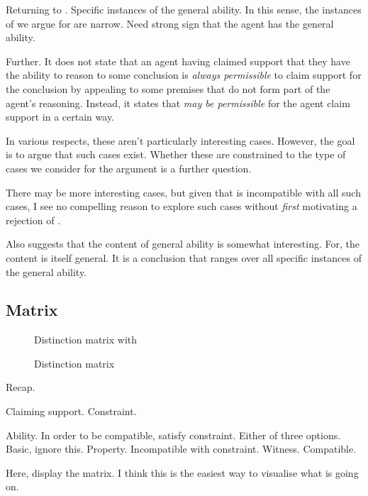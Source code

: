 \begin{note}
  Returning to \EAS{}.
  Specific instances of the general ability.
  In this sense, the instances of \EAS{} we argue for are narrow.
  Need strong sign that the agent has the general ability.

  Further.
  It does not state that an agent having claimed support that they have the ability to reason to some conclusion is \emph{always permissible} to claim support for the conclusion by appealing to some premises that do not form part of the agent's reasoning.
  Instead, it states that \emph{may be permissible} for the agent claim support in a certain way.

  In various respects, these aren't particularly interesting cases.
  However, the goal is to argue that such cases exist.
  Whether these are constrained to the type of cases we consider for the argument is a further question.

  There may be more interesting cases, but given that \ESU{} is incompatible with all such cases, I see no compelling reason to explore such cases without \emph{first} motivating a rejection of \ESU{}.
\end{note}

\begin{note}
  Also suggests that the content of general ability is somewhat interesting.
  For, the content is itself general.
  It is a conclusion that ranges over all specific instances of the general ability.
\end{note}

\subsection{Matrix}

\begin{note}
  \begin{figure}[H]
    \centering
    \saMtxInterpreted{}
    \caption{Distinction matrix with }
    \label{fig:saMtxInterpreted:outline}
  \end{figure}
\end{note}

\begin{note}
  \begin{figure}[H]
    \centering
    \saMtxRuledOut{}
    \caption{Distinction matrix}
    \label{fig:saMtxRuledOut:outline}
  \end{figure}
\end{note}

\begin{note}
  Recap.

  Claiming support.
  Constraint.

  Ability.
  In order to be compatible, satisfy constraint.
  Either of three options.
  Basic, ignore this.
  Property. Incompatible with constraint.
  Witness. Compatible.

  Here, display the matrix.
  I think this is the easiest way to visualise what is going on.
\end{note}


